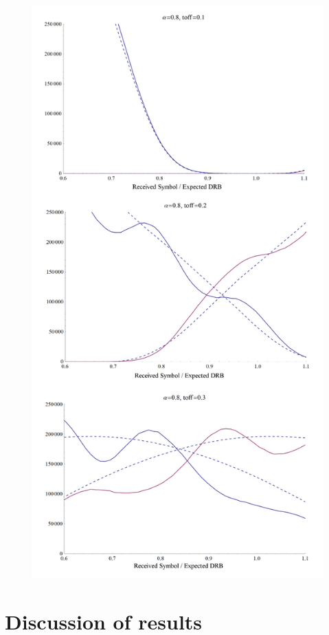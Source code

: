 \begin{figure}[htbp]
\centering
\includegraphics[height=\textheight]{comparison_boundary.png}
\end{figure}

\chapter{Discussion of results}

